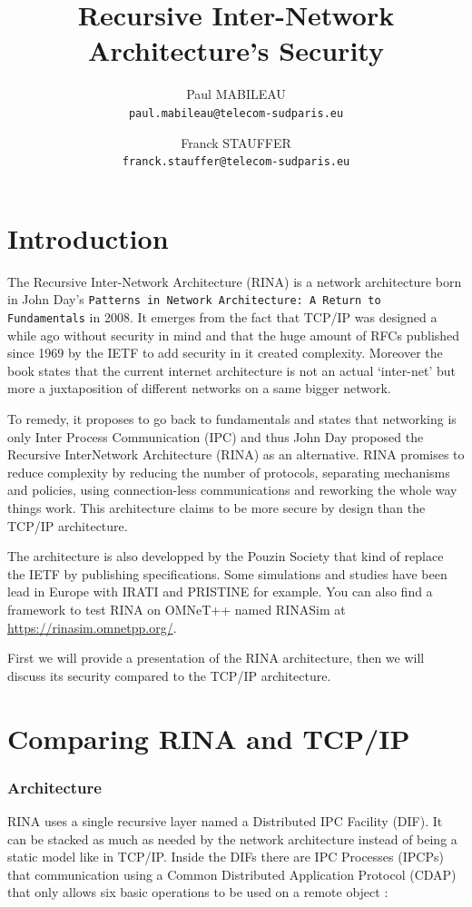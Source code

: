 \documentclass[a4paper]{proc}
\author{Paul MABILEAU\\\texttt{paul.mabileau@telecom-sudparis.eu}
        \and Franck STAUFFER\\\texttt{franck.stauffer@telecom-sudparis.eu}}
\title{\textbf{Recursive Inter-Network Architecture's Security}}
\begin{document}
\maketitle
\tableofcontents
\newpage
\part{Introduction}

The Recursive Inter-Network Architecture (RINA) is a network architecture born
in John Day's \texttt{Patterns in Network Architecture: A Return to
Fundamentals} in 2008.  It emerges from the fact that TCP/IP was designed a
while ago without security in mind and that the huge amount of RFCs\cite{rfc}
published since 1969 by the IETF to add security in it created
complexity.\cite{assessing-security} Moreover the book states that the current
internet architecture is not an actual `inter-net' but more a juxtaposition of
different networks on a same bigger network.

To remedy, it proposes to go back to fundamentals and states that networking is
only Inter Process Communication (IPC) and thus John Day proposed the Recursive
InterNetwork Architecture (RINA) as an alternative.  RINA promises to reduce
complexity by reducing the number of protocols, separating mechanisms and
policies, using connection-less communications and reworking the whole way
things work.  This architecture claims to be more secure by design than the
TCP/IP architecture.

The architecture is also developped by the Pouzin Society\cite{psoc} that kind
of replace the IETF by publishing specifications.  Some simulations and studies
have been lead in Europe with IRATI\cite{web:irati} and PRISTINE\cite{pristine}
for example.  You can also find a framework to test RINA on OMNeT++ named
RINASim at \url{https://rinasim.omnetpp.org/}.

First we will provide a presentation of the RINA architecture, then we will
discuss its security compared to the TCP/IP architecture.

\newpage
\part{Comparing RINA and TCP/IP}
\section{Architecture}

RINA uses a single recursive layer named a Distributed IPC Facility (DIF). It
can be stacked as much as needed by the network architecture instead of being a
static model like in TCP/IP\@.  Inside the DIFs there are IPC Processes (IPCPs)
that communication using a Common Distributed Application Protocol (CDAP) that
only allows six basic operations to be used on a remote object
\cite{Trouva2011ISTI}:
\end{document}
